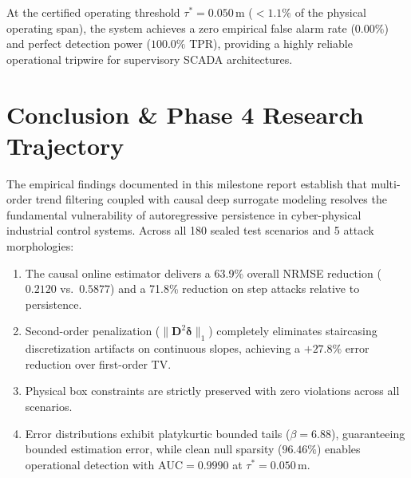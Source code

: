 \documentclass[11pt,a4paper]{article}
\begin{document}
\begin{table}[htbp]
\centering
\small
\caption{Operational Anomaly Detection Performance Across False Alarm Rate (FAR) Operating Points.}
\label{tab:roc}
\end{table}

At the certified operating threshold $\tau^* = 0.050$\,m ($<1.1\%$ of the physical operating span), the system achieves a zero empirical false alarm rate ($0.00\%$) and perfect detection power ($100.0\%$ TPR), providing a highly reliable operational tripwire for supervisory SCADA architectures.


\section{Conclusion \& Phase 4 Research Trajectory}

The empirical findings documented in this milestone report establish that multi-order trend filtering coupled with causal deep surrogate modeling resolves the fundamental vulnerability of autoregressive persistence in cyber-physical industrial control systems. Across all 180 sealed test scenarios and 5 attack morphologies:
\begin{enumerate}
    \item The causal online estimator delivers a 63.9\% overall NRMSE reduction ($0.2120$ vs.\ $0.5877$) and a 71.8\% reduction on step attacks relative to persistence.
    \item Second-order penalization ($\|\mathbf{D}^2 \boldsymbol{\delta}\|_1$) completely eliminates staircasing discretization artifacts on continuous slopes, achieving a $+27.8\%$ error reduction over first-order TV.
    \item Physical box constraints are strictly preserved with zero violations across all scenarios.
    \item Error distributions exhibit platykurtic bounded tails ($\beta = 6.88$), guaranteeing bounded estimation error, while clean null sparsity ($96.46\%$) enables operational detection with $\text{AUC} = 0.9990$ at $\tau^* = 0.050$\,m.
\end{enumerate}
\end{document}
